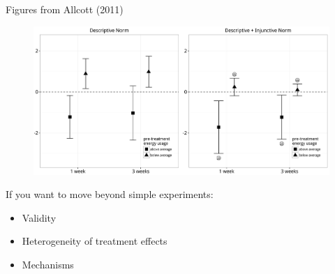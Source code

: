 \documentclass[aspectratio=169]{beamer}
\def\vf{\vfill}
\begin{document}
\begin{frame}

\begin{figure}
  \centering
\end{figure}

\vf
\tiny{Figures from Allcott (2011)}

\end{frame}
\begin{frame}

\begin{figure}
  \centering
  \includegraphics[width = \textwidth]{figures/schultz_constructive_2007_23panel}
\end{figure}

\end{frame}
\begin{frame}

If you want to move beyond simple experiments:
\begin{itemize}
\item Validity
\item Heterogeneity of treatment effects
\item Mechanisms
\end{itemize}

\end{frame}
\end{document}
